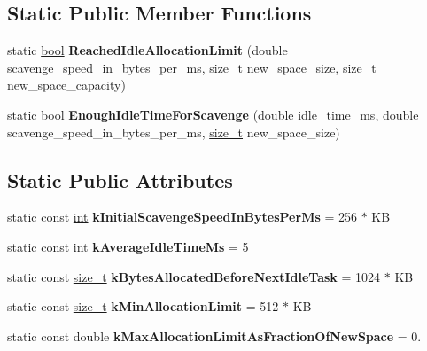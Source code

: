 \subsection*{Static Public Member Functions}
\begin{DoxyCompactItemize}
\item 
\mbox{\label{classv8_1_1internal_1_1ScavengeJob_abc8b32ff3da05cb65d845027951590ec}} 
static \mbox{\hyperlink{classbool}{bool}} {\bfseries Reached\+Idle\+Allocation\+Limit} (double scavenge\+\_\+speed\+\_\+in\+\_\+bytes\+\_\+per\+\_\+ms, \mbox{\hyperlink{classsize__t}{size\+\_\+t}} new\+\_\+space\+\_\+size, \mbox{\hyperlink{classsize__t}{size\+\_\+t}} new\+\_\+space\+\_\+capacity)
\item 
\mbox{\label{classv8_1_1internal_1_1ScavengeJob_a055df953f929bd8b42d52d1ca96958b3}} 
static \mbox{\hyperlink{classbool}{bool}} {\bfseries Enough\+Idle\+Time\+For\+Scavenge} (double idle\+\_\+time\+\_\+ms, double scavenge\+\_\+speed\+\_\+in\+\_\+bytes\+\_\+per\+\_\+ms, \mbox{\hyperlink{classsize__t}{size\+\_\+t}} new\+\_\+space\+\_\+size)
\end{DoxyCompactItemize}
\subsection*{Static Public Attributes}
\begin{DoxyCompactItemize}
\item 
\mbox{\label{classv8_1_1internal_1_1ScavengeJob_a73be7a33cd4c9e0621139a61a24524a1}} 
static const \mbox{\hyperlink{classint}{int}} {\bfseries k\+Initial\+Scavenge\+Speed\+In\+Bytes\+Per\+Ms} = 256 $\ast$ KB
\item 
\mbox{\label{classv8_1_1internal_1_1ScavengeJob_a23416920357abe1bedcad9805017ddd1}} 
static const \mbox{\hyperlink{classint}{int}} {\bfseries k\+Average\+Idle\+Time\+Ms} = 5
\item 
\mbox{\label{classv8_1_1internal_1_1ScavengeJob_ae367f695e5a1f6ce8162921108c465e3}} 
static const \mbox{\hyperlink{classsize__t}{size\+\_\+t}} {\bfseries k\+Bytes\+Allocated\+Before\+Next\+Idle\+Task} = 1024 $\ast$ KB
\item 
\mbox{\label{classv8_1_1internal_1_1ScavengeJob_a2b8d60098d3eb019b700acb261facbf8}} 
static const \mbox{\hyperlink{classsize__t}{size\+\_\+t}} {\bfseries k\+Min\+Allocation\+Limit} = 512 $\ast$ KB
\item 
\mbox{\label{classv8_1_1internal_1_1ScavengeJob_aa7e3f75336725f3ecf2aff805fd2c29e}} 
static const double {\bfseries k\+Max\+Allocation\+Limit\+As\+Fraction\+Of\+New\+Space} = 0.
\end{DoxyCompactItemize}


